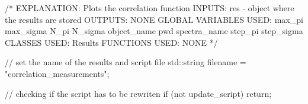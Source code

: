 \begin{DoxyCode}
                                                                               
                          {
    /*
     EXPLANATION:
     Plots the correlation function
     INPUTS:
     res - object where the results are stored
     OUTPUTS:
     NONE
     GLOBAL VARIABLES USED:
     max_pi
     max_sigma
     N_pi
     N_sigma
     object_name
     pwd
     spectra_name
     step_pi
     step_sigma
     CLASSES USED:
     Results
     FUNCTIONS USED:
     NONE
     */
    
    // set the name of the results and script file
    std::string filename = "correlation_measurements";
        
    // checking if the script has to be rewriten
    if (not update_script){
        return;
    }
    
}
\end{DoxyCode}
